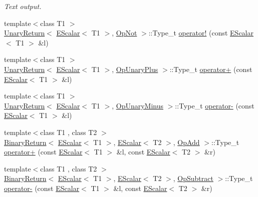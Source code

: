 \begin{DoxyCompactItemize}
\begin{DoxyCompactList}\small\item\em Text output. \end{DoxyCompactList}\item 
{\footnotesize template$<$class T1 $>$ }\\\mbox{\hyperlink{structENSEM_1_1UnaryReturn}{Unary\+Return}}$<$ \mbox{\hyperlink{classENSEM_1_1EScalar}{E\+Scalar}}$<$ T1 $>$, \mbox{\hyperlink{structENSEM_1_1OpNot}{Op\+Not}} $>$\+::Type\+\_\+t \mbox{\hyperlink{group__escalar_ga248e30ef2d97325ac4b11c077bc514dd}{operator!}} (const \mbox{\hyperlink{classENSEM_1_1EScalar}{E\+Scalar}}$<$ T1 $>$ \&l)
\item 
{\footnotesize template$<$class T1 $>$ }\\\mbox{\hyperlink{structENSEM_1_1UnaryReturn}{Unary\+Return}}$<$ \mbox{\hyperlink{classENSEM_1_1EScalar}{E\+Scalar}}$<$ T1 $>$, \mbox{\hyperlink{structENSEM_1_1OpUnaryPlus}{Op\+Unary\+Plus}} $>$\+::Type\+\_\+t \mbox{\hyperlink{group__escalar_ga45a6583b8f7490b2e54b5c88ff07ba94}{operator+}} (const \mbox{\hyperlink{classENSEM_1_1EScalar}{E\+Scalar}}$<$ T1 $>$ \&l)
\item 
{\footnotesize template$<$class T1 $>$ }\\\mbox{\hyperlink{structENSEM_1_1UnaryReturn}{Unary\+Return}}$<$ \mbox{\hyperlink{classENSEM_1_1EScalar}{E\+Scalar}}$<$ T1 $>$, \mbox{\hyperlink{structENSEM_1_1OpUnaryMinus}{Op\+Unary\+Minus}} $>$\+::Type\+\_\+t \mbox{\hyperlink{group__escalar_ga19df0fab753be25388f62c774ecdffae}{operator-\/}} (const \mbox{\hyperlink{classENSEM_1_1EScalar}{E\+Scalar}}$<$ T1 $>$ \&l)
\item 
{\footnotesize template$<$class T1 , class T2 $>$ }\\\mbox{\hyperlink{structENSEM_1_1BinaryReturn}{Binary\+Return}}$<$ \mbox{\hyperlink{classENSEM_1_1EScalar}{E\+Scalar}}$<$ T1 $>$, \mbox{\hyperlink{classENSEM_1_1EScalar}{E\+Scalar}}$<$ T2 $>$, \mbox{\hyperlink{structENSEM_1_1OpAdd}{Op\+Add}} $>$\+::Type\+\_\+t \mbox{\hyperlink{group__escalar_gacf8bfdceca4578af5c8007fe00b2bf8e}{operator+}} (const \mbox{\hyperlink{classENSEM_1_1EScalar}{E\+Scalar}}$<$ T1 $>$ \&l, const \mbox{\hyperlink{classENSEM_1_1EScalar}{E\+Scalar}}$<$ T2 $>$ \&r)
\item 
{\footnotesize template$<$class T1 , class T2 $>$ }\\\mbox{\hyperlink{structENSEM_1_1BinaryReturn}{Binary\+Return}}$<$ \mbox{\hyperlink{classENSEM_1_1EScalar}{E\+Scalar}}$<$ T1 $>$, \mbox{\hyperlink{classENSEM_1_1EScalar}{E\+Scalar}}$<$ T2 $>$, \mbox{\hyperlink{structENSEM_1_1OpSubtract}{Op\+Subtract}} $>$\+::Type\+\_\+t \mbox{\hyperlink{group__escalar_gaab8719cf0db585f9ffd1685fff3e96d4}{operator-\/}} (const \mbox{\hyperlink{classENSEM_1_1EScalar}{E\+Scalar}}$<$ T1 $>$ \&l, const \mbox{\hyperlink{classENSEM_1_1EScalar}{E\+Scalar}}$<$ T2 $>$ \&r)

\end{DoxyCompactItemize}

